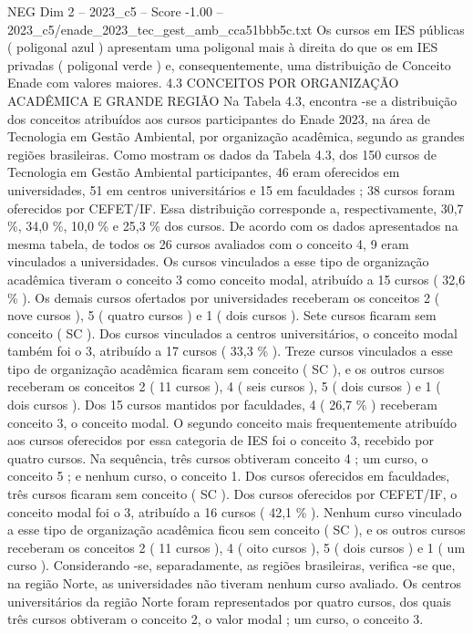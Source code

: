 \begin{textsample}{NEG Dim 2 – 2023\_c5 – Score -1.00 – 2023\_c5/enade\_2023\_tec\_gest\_amb\_cca51bbb5c.txt}
Os cursos em IES públicas ( poligonal azul ) apresentam uma poligonal mais à direita do que os em IES privadas ( poligonal verde ) e, consequentemente, uma distribuição de Conceito Enade com valores maiores. 4.3 CONCEITOS POR ORGANIZAÇÃO ACADÊMICA E GRANDE REGIÃO Na Tabela 4.3, encontra -se a distribuição dos conceitos atribuídos aos cursos participantes do Enade 2023, na área de Tecnologia em Gestão Ambiental, por organização acadêmica, segundo as grandes regiões brasileiras.
Como mostram os dados da Tabela 4.3, dos 150 cursos de Tecnologia em Gestão Ambiental participantes, 46 eram oferecidos em universidades, 51 em centros universitários e 15 em faculdades ; 38 cursos foram oferecidos por CEFET/IF.
Essa distribuição corresponde a, respectivamente, 30,7 \%, 34,0 \%, 10,0 \% e 25,3 \% dos cursos.
De acordo com os dados apresentados na mesma tabela, de todos os 26 cursos avaliados com o conceito 4, 9 eram vinculados a universidades.
Os cursos vinculados a esse tipo de organização acadêmica tiveram o conceito 3 como conceito modal, atribuído a 15 cursos ( 32,6 \% ).
Os demais cursos ofertados por universidades receberam os conceitos 2 ( nove cursos ), 5 ( quatro cursos ) e 1 ( dois cursos ).
Sete cursos ficaram sem conceito ( SC ).
Dos cursos vinculados a centros universitários, o conceito modal também foi o 3, atribuído a 17 cursos ( 33,3 \% ).
Treze cursos vinculados a esse tipo de organização acadêmica ficaram sem conceito ( SC ), e os outros cursos receberam os conceitos 2 ( 11 cursos ), 4 ( seis cursos ), 5 ( dois cursos ) e 1 ( dois cursos ).
Dos 15 cursos mantidos por faculdades, 4 ( 26,7 \% ) receberam conceito 3, o conceito modal.
O segundo conceito mais frequentemente atribuído aos cursos oferecidos por essa categoria de IES foi o conceito 3, recebido por quatro cursos.
Na sequência, três cursos obtiveram conceito 4 ; um curso, o conceito 5 ; e nenhum curso, o conceito 1.
Dos cursos oferecidos em faculdades, três cursos ficaram sem conceito ( SC ).
Dos cursos oferecidos por CEFET/IF, o conceito modal foi o 3, atribuído a 16 cursos ( 42,1 \% ).
Nenhum curso vinculado a esse tipo de organização acadêmica ficou sem conceito ( SC ), e os outros cursos receberam os conceitos 2 ( 11 cursos ), 4 ( oito cursos ), 5 ( dois cursos ) e 1 ( um curso ).
Considerando -se, separadamente, as regiões brasileiras, verifica -se que, na região Norte, as universidades não tiveram nenhum curso avaliado.
Os centros universitários da região Norte foram representados por quatro cursos, dos quais três cursos obtiveram o conceito 2, o valor modal ; um curso, o conceito 3.

\end{textsample}
